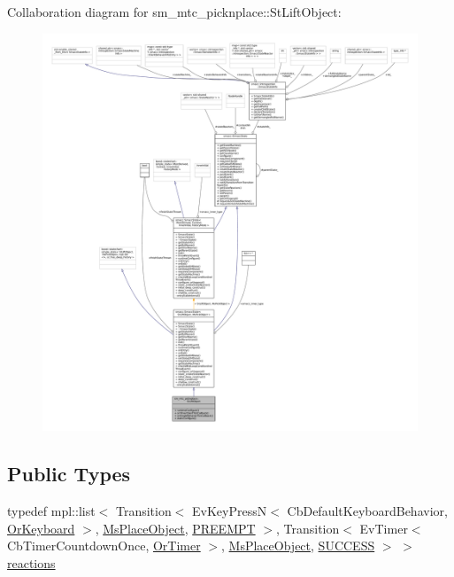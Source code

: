 Collaboration diagram for sm\+\_\+mtc\+\_\+picknplace\+:\+:St\+Lift\+Object\+:
\nopagebreak
\begin{figure}[H]
\begin{center}
\leavevmode
\includegraphics[width=350pt]{structsm__mtc__picknplace_1_1StLiftObject__coll__graph}
\end{center}
\end{figure}
\subsection*{Public Types}
\begin{DoxyCompactItemize}
\item 
typedef mpl\+::list$<$ Transition$<$ Ev\+Key\+PressN$<$ Cb\+Default\+Keyboard\+Behavior, \hyperlink{classsm__mtc__picknplace_1_1OrKeyboard}{Or\+Keyboard} $>$, \hyperlink{classsm__mtc__picknplace_1_1MsPlaceObject}{Ms\+Place\+Object}, \hyperlink{classPREEMPT}{P\+R\+E\+E\+M\+PT} $>$, Transition$<$ Ev\+Timer$<$ Cb\+Timer\+Countdown\+Once, \hyperlink{classsm__mtc__picknplace_1_1OrTimer}{Or\+Timer} $>$, \hyperlink{classsm__mtc__picknplace_1_1MsPlaceObject}{Ms\+Place\+Object}, \hyperlink{classSUCCESS}{S\+U\+C\+C\+E\+SS} $>$ $>$ \hyperlink{structsm__mtc__picknplace_1_1StLiftObject_ab3f702777b8da45968441785b96174ff}{reactions}
\end{DoxyCompactItemize}
